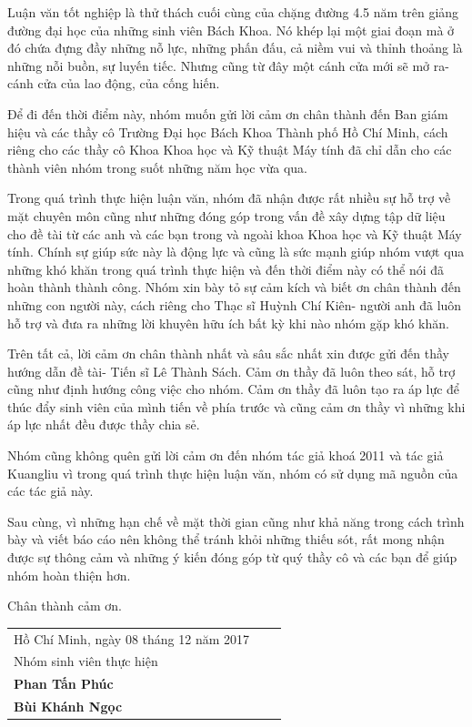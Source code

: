 \documentclass[a4paper,12pt]{article}
\begin{document}
	Luận văn tốt nghiệp là thử thách cuối cùng của chặng đường 4.5 năm trên giảng đường đại học của những sinh viên Bách Khoa. Nó khép lại một giai đoạn mà ở đó chứa đựng đầy những nỗ lực, những phấn đấu, cả niềm vui và thỉnh thoảng là những nỗi buồn, sự luyến tiếc. Nhưng cũng từ đây một cánh cửa mới sẽ mở ra- cánh cửa của lao động, của cống hiến. 
	
	Để đi đến thời điểm này, nhóm muốn gửi lời cảm ơn chân thành đến Ban giám hiệu và các thầy cô Trường Đại học Bách Khoa Thành phố Hồ Chí Minh, cách riêng cho các thầy cô Khoa Khoa học và Kỹ thuật Máy tính đã chỉ dẫn cho các thành viên nhóm trong suốt những năm học vừa qua.
	
	Trong quá trình thực hiện luận văn, nhóm đã nhận được rất nhiều sự hỗ trợ về mặt chuyên môn cũng như những đóng góp trong vấn đề xây dựng tập dữ liệu cho đề tài từ các anh và các bạn trong và ngoài khoa Khoa học và Kỹ thuật Máy tính. Chính sự giúp sức này là động lực và cũng là sức mạnh giúp nhóm vượt qua những khó khăn trong quá trình thực hiện và đến thời điểm này có thể nói đã hoàn thành thành công. Nhóm xin bày tỏ sự cảm kích và biết ơn chân thành đến những con người này, cách riêng cho Thạc sĩ Huỳnh Chí Kiên- người anh đã luôn hỗ trợ và đưa ra những lời khuyên hữu ích bất kỳ khi nào nhóm gặp khó khăn. 
	
	Trên tất cả, lời cảm ơn chân thành nhất và sâu sắc nhất xin được gửi đến thầy hướng dẫn đề tài- Tiến sĩ Lê Thành Sách. Cảm ơn thầy đã luôn theo sát, hỗ trợ cũng như định hướng công việc cho nhóm. Cảm ơn thầy đã luôn tạo ra áp lực để thúc đẩy sinh viên của mình tiến về phía trước và cũng cảm ơn thầy vì những khi áp lực nhất đều được thầy chia sẻ. 
	
	Nhóm cũng không quên gửi lời cảm ơn đến nhóm tác giả khoá 2011\cite{qak} và tác giả Kuangliu\cite{github} vì trong quá trình thực hiện luận văn, nhóm có sử dụng mã nguồn của các tác giả này.
	
	Sau cùng, vì những hạn chế về mặt thời gian cũng như khả năng trong cách trình bày và viết báo cáo nên không thể tránh khỏi những thiếu sót, rất mong nhận được sự thông cảm và những ý kiến đóng góp từ quý thầy cô và các bạn để giúp nhóm hoàn thiện hơn.
	
	Chân thành cảm ơn.
	
	\begin{table}[h]
		\begin{tabular}{lll}
			\hspace{8cm} Hồ Chí Minh, ngày 08 tháng 12 năm 2017\\
			\hspace{10cm}Nhóm sinh viên thực hiện\\
			\hspace{10.5cm}\textbf{Phan Tấn Phúc}\\
			\hspace{10.5cm}\textbf{Bùi Khánh Ngọc}
		\end{tabular}
	\end{table}
	
\end{document}

